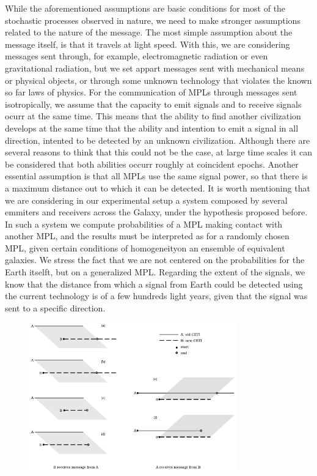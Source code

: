 While the aforementioned assumptions are basic conditions for most of
the stochastic processes observed in nature, we need to make stronger
assumptions related to the nature of the message.
%
The most simple assumption about the message itself, is that it
travels at light speed.
%
With this, we are considering messages sent through, for example,
electromagnetic radiation or even gravitational radiation, but we set
appart messages sent with mechanical means or physical objects, or
through some unknown technology that violates the known so far laws of
physics.
% 
For the communication of MPLs through messages sent isotropically, we
assume that the capacity to emit signals and to receive signals ocurr
at the same time.
%
This means that the ability to find another civilization develops at
the same time that the ability and intention to emit a signal in all
direction, intented to be detected by an unknown civilization.
%
Although there are several reasons to think that this could not be the
case, at large time scales it can be considered that both abilities
occurr roughly at coincident epochs.
%
Another essential assumption is that all MPLs use the same signal
power, so that there is a maximum distance out to which it can be
detected.
%
It is worth mentioning that we are considering in our experimental
setup a system composed by several emmiters and receivers across the
Galaxy, under the hypothesis proposed before.
%
In such a system we compute probabilities of a MPL making contact
with another MPL, and the results must be interpreted as for a
randomly chosen MPL, given certain conditions of homogeneityon an
ensemble of equivalent galaxies.
%
We stress the fact that we are not centered on the probabilities for
the Earth itselft, but on a generalized MPL.
%
Regarding the extent of the signals, we know that the distance from
which a signal from Earth could be detected using the current
technology is of a few hundreds light years, given that the signal was
sent to a specific direction.


\begin{figure}
   \centering
   \includegraphics[width=0.8\textwidth]{Messages_01.pdf}
    \label{F_messages}
\end{figure}
                     

